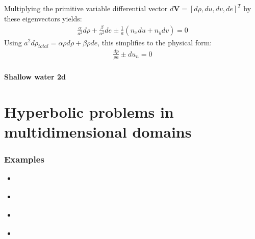 \documentclass[letterpaper,10pt,english]{jupyterBook}
\begin{document}
\sphinxAtStartPar
{}
Multiplying the primitive variable differential vector \(d\mathbf{V} = [d\rho, du, dv, de]^T\) by these eigenvectors yields:
\begin{equation*}
\begin{split} \frac{\alpha}{a^2} d\rho + \frac{\beta}{a^2} de \pm \frac{1}{a}(n_x du + n_y dv) = 0 \end{split}
\end{equation*}
\sphinxAtStartPar
Using \(a^2 d\rho_{total} = \alpha \rho d\rho + \beta \rho de\), this simplifies to the physical form:
\begin{equation*}
\begin{split} \frac{dp}{\rho a} \pm du_n = 0 \end{split}
\end{equation*}

\paragraph{Shallow water \sphinxhyphen{} 2d}
\label{\detokenize{ch/pde/characteristics:shallow-water-2d}}
\sphinxstepscope


\section{Hyperbolic problems in multi\sphinxhyphen{}dimensional domains}
\label{\detokenize{ch/pde/hyperbolic-nd:hyperbolic-problems-in-multi-dimensional-domains}}\label{\detokenize{ch/pde/hyperbolic-nd:pde-hyperbolic-nd}}\label{\detokenize{ch/pde/hyperbolic-nd::doc}}\subsubsection*{Examples}
\begin{itemize}
\item {} 
\sphinxAtStartPar
{\hyperref[\detokenize{ch/pde/hyperbolic-nd-draft:pde-hyperbolic-nd-draft}]{}} 

\item {} 
\sphinxAtStartPar
{\hyperref[\detokenize{ch/pde/hyperbolic-nd-psys:pde-hyperbolic-nd-psys}]{}}

\item {} 
\sphinxAtStartPar
{\hyperref[\detokenize{ch/pde/hyperbolic-nd-euler:pde-hyperbolic-nd-euler}]{}}

\item {} 
\sphinxAtStartPar
{\hyperref[\detokenize{ch/pde/hyperbolic-nd-shallow-water:pde-hyperbolic-nd-shallow-water}]{}}

\end{itemize}
\end{document}
